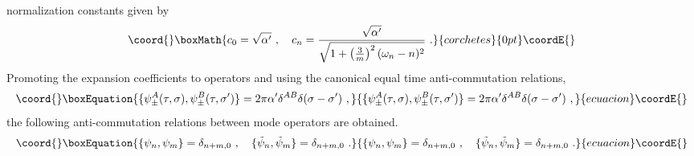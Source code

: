 \documentclass[a4paper,12pt]{article}
\numberwithin{equation}{section}
\begin{document}
normalization constants given by
\[\coord{}\boxMath{
c_0 = \sqrt{\alpha'}~,~~~
c_n = \frac{\sqrt{\alpha'}}{\sqrt{1 +
          \left( \frac{3}{m} \right)^2 (\omega_n - n)^2 } }~.
}{corchetes}{0pt}\coordE{}\]
Promoting the expansion coefficients to operators and using the
canonical equal time anti-commutation relations,
\begin{equation}\coord{}\boxEquation{
\{ \psi^A_\pm (\tau, \sigma), \psi^B_\pm (\tau, \sigma') \}
= 2 \pi \alpha' \delta^{AB} \delta (\sigma - \sigma') ~,
\label{fcom}
}{
\{ \psi^A_\pm (\tau, \sigma), \psi^B_\pm (\tau, \sigma') \}
= 2 \pi \alpha' \delta^{AB} \delta (\sigma - \sigma') ~,
}{ecuacion}\coordE{}\end{equation}
the following anti-commutation relations between mode operators are
obtained.
\begin{equation}\coord{}\boxEquation{
\{ \psi_n , \psi_m \} = \delta_{n+m,0} ~,~~~
\{ \tilde{\psi}_n, \tilde{\psi}_m \} = \delta_{n+m,0}~.
\label{fmcom}
}{
\{ \psi_n , \psi_m \} = \delta_{n+m,0} ~,~~~
\{ \tilde{\psi}_n, \tilde{\psi}_m \} = \delta_{n+m,0}~.
}{ecuacion}\coordE{}\end{equation}
\end{document}
